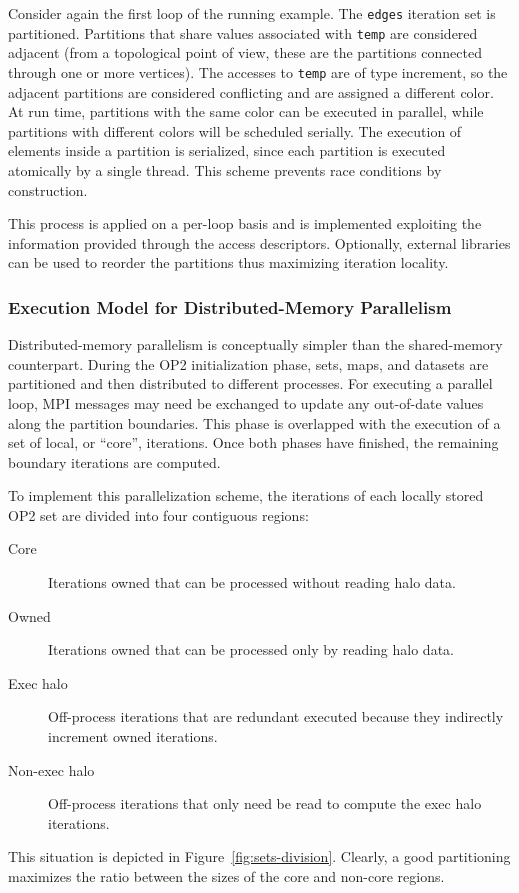 Consider again the first loop of the running example. The {\tt edges} iteration set is partitioned. Partitions that share values associated with {\tt temp} are considered adjacent (from a topological point of view, these are the partitions connected through one or more vertices). The accesses to {\tt temp} are of type increment, so the adjacent partitions are considered conflicting and are assigned a different color. At run time, partitions with the same color can be executed in parallel, while partitions with different colors will be scheduled serially. The execution of elements inside a partition is serialized, since each partition is executed atomically by a single thread. This scheme prevents race conditions by construction. 

This process is applied on a per-loop basis and is implemented exploiting the information provided through the access descriptors. Optionally, external libraries can be used to reorder the partitions thus maximizing iteration locality. 

\subsubsection{Execution Model for Distributed-Memory Parallelism}
Distributed-memory parallelism is conceptually simpler than the shared-memory counterpart. During the OP2 initialization phase, sets, maps, and datasets are partitioned and then distributed to different processes. For executing a parallel loop, MPI messages may need be exchanged to update any out-of-date values along the partition boundaries. This phase is overlapped with the execution of a set of local, or ``core'', iterations. Once both phases have finished, the remaining boundary iterations are computed.

To implement this parallelization scheme, the iterations of each locally stored OP2 set are divided into four contiguous regions:
\begin{description}
\item[Core] Iterations owned that can be processed without reading halo data. 
\item[Owned] Iterations owned that can be processed only by reading halo data.
\item[Exec halo] Off-process iterations that are redundant executed because they indirectly increment owned iterations.
\item[Non-exec halo] Off-process iterations that only need be read to compute the exec halo iterations.
\end{description}
This situation is depicted in Figure~\ref{fig:sets-division}. Clearly, a good partitioning maximizes the ratio between the sizes of the core and non-core regions. 

